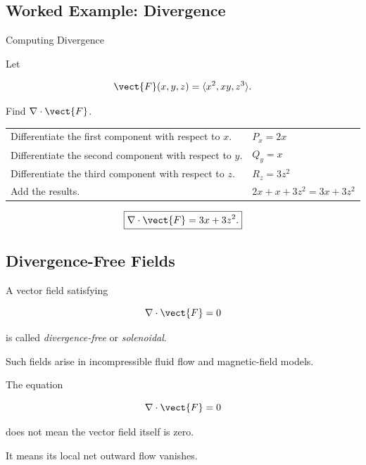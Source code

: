 \subsection{Worked Example: Divergence}
\label{subsec:worked-divergence}

\begin{workedexamplebox}{Computing Divergence}

Let

\[ \vect{F}(x,y,z)=\langle x^2,xy,z^3\rangle. \]

Find \(\nabla\cdot\vect{F}\).

\begin{tabularx}{\textwidth}{@{}>{\raggedright\arraybackslash}p{}X@{}}
Differentiate the first component with respect to \(x\). &
\(P_x=2x\)\\
Differentiate the second component with respect to \(y\). &
\(Q_y=x\)\\
Differentiate the third component with respect to \(z\). &
\(R_z=3z^2\)\\
Add the results. &
\(2x+x+3z^2=3x+3z^2\)
\end{tabularx}

\begin{answerbox}
\[ \boxed{\nabla\cdot\vect{F}=3x+3z^2.} \]
\end{answerbox}
\end{workedexamplebox}

\subsection{Divergence-Free Fields}
\label{subsec:divergence-free}

A vector field satisfying

\[ \nabla\cdot\vect{F}=0 \]

is called \emph{divergence-free} or \emph{solenoidal}.

Such fields arise in incompressible fluid flow and magnetic-field models.

The equation

\[ \nabla\cdot\vect{F}=0 \]

does not mean the vector field itself is zero.

It means its local net outward flow vanishes.


